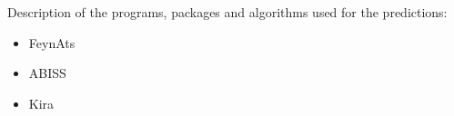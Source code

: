 Description of the programs, packages and algorithms used for the predictions:

\begin{itemize}
	\item FeynAts
	\item ABISS
	\item Kira
\end{itemize}